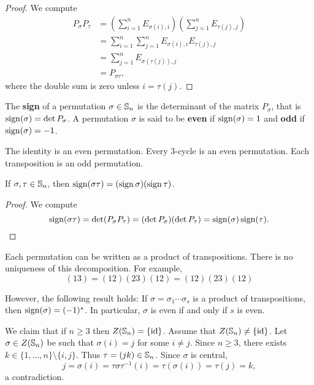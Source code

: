 \begin{proof}
We compute 
\begin{align*}
P_\sigma P_\tau &=\left(\sum_{i=1}^n E_{\sigma(i),i}\right)\left(\sum_{j=1}^nE_{\tau{(j)},j}\right)\\
&=\sum_{i=1}^n\sum_{j=1}^n E_{\sigma(i),i}E_{\tau(j),j}\\
&=\sum_{j=1}^n E_{\sigma(\tau(j)),j}\\
&=P_{\sigma\tau},
\end{align*}
where the double sum is zero unless $i=\tau(j)$.
\end{proof}


\begin{definition}
    The \textbf{sign} of a permutation $\sigma\in\mathbb{S}_n$ 
    is the 
    determinant of the matrix 
    $P_\sigma$, that is $\operatorname{sign}(\sigma)=\det P_\sigma$.
    A permutation $\sigma$ is said to be \textbf{even} if $\operatorname{sign}(\sigma)=1$ and \textbf{odd} if $\operatorname{sign}(\sigma)=-1$.
\end{definition}

The identity is an even permutation. Every 3-cycle is
an even permutation. Each transposition is an odd permutation. 

\begin{proposition}
If $\sigma,\tau\in\mathbb{S}_n$, then $\operatorname{sign}(\sigma\tau)=(\operatorname{sign}\sigma)(\operatorname{sign}\tau)$.
\end{proposition}

\begin{proof}
        We compute 
        \[
        \operatorname{sign}(\sigma\tau)=\det(P_\sigma P_\tau)=(\det P_\sigma)(\det P_\tau)=\operatorname{sign}(\sigma)\operatorname{sign}(\tau).\qedhere
        \]
\end{proof}

Each permutation can be written as a product of transpositions. 
There is no uniqueness of this decomposition. For example, 
\[
(13)=(12)(23)(12)=(12)(23)(12)
\]

However, the following result holds: If 
$\sigma=\sigma_1\cdots\sigma_s$ is a product of transpositions, 
then $\operatorname{sign}(\sigma)=(-1)^s$.
In particular, $\sigma$ is even if and only if
$s$ is even. 


\begin{example}
We claim that if $n\geq3$ then $Z(\mathbb{S}_n)=\{\operatorname{id}\}$.
Assume that $Z(\mathbb{S}_n)\ne\{\operatorname{id}\}$. Let 
$\sigma\in Z(\mathbb{S}_n)$ be such that $\sigma(i)=j$ for some $i\ne j$. Since $n\geq3$, there exists $k\in\{1,\dots,n
\}\setminus\{i,j\}$. Thus 
$\tau=(jk)\in\mathbb{S}_n$. Since $\sigma$ is central, 
\[
j=\sigma(i)=\tau\sigma\tau^{-1}(i)=\tau(\sigma(i))=\tau(j)=k,
\]
a contradiction.
\end{example}

